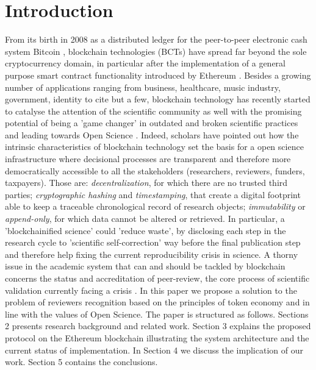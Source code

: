 \documentclass[runningheads]{llncs}
\begin{document}
\section{Introduction}
From its birth in 2008 as a distributed ledger for the peer-to-peer electronic cash system Bitcoin \cite{BitcoinSatoshi}, blockchain technologies (BCTs) have spread far beyond the sole cryptocurrency domain, in particular after the implementation of a general purpose smart contract functionality introduced by Ethereum \cite{Ethereum}.
Besides a growing number of applications ranging from business, healthcare, music industry, government, identity to cite but a few, blockchain technology has recently started to catalyse the attention of the scientific community as well \cite{Bitcoin-Nature-focus,vanRossum2017-DigSci} with the promising potential of being a 'game changer' in outdated and broken scientific practices and leading towards Open Science \cite{AES}. Indeed, scholars have pointed out how the intrinsic characteristics of blockchain technology set the basis for a open science infrastructure \cite{ReviewBlockchain2019} where decisional processes are transparent and therefore more democratically accessible to all the stakeholders (researchers, reviewers, funders, taxpayers). Those are: \emph{decentralization}, for which there are no trusted third parties; \emph{cryptographic hashing} and \emph{timestamping}, that create a digital footprint able to keep a traceable chronological record of research objects; \emph{immutability} or \emph{append-only}, for which data cannot be altered or retrieved. In particular, a 'blockchainified science'\cite{BlockchainforScience} could 'reduce waste'\cite{ReducingWaste-Lancet}, by disclosing each step in the research cycle to 'scientific self-correction' way before the final publication step and therefore help fixing the current reproducibility crisis in science.
\newline A thorny issue in the academic system that can and should be tackled by blockchain concerns the status and accreditation of peer-review, the core process of scientific validation currently facing a crisis \cite{Gropp-PeerRevStress}.
In this paper we propose a solution to the problem of reviewers recognition based on the principles of token economy and in line with the values of Open Science.
\newline The paper is structured as follows. Sections 2 presents research background and related work. Section 3 explains the proposed protocol on the Ethereum blockchain illustrating the system architecture and the current status of implementation. In Section 4 we discuss the implication of our work. Section 5 contains the conclusions.
\end{document}
